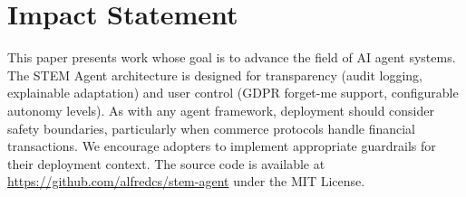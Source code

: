 \documentclass{article}
\begin{document}
\section*{Impact Statement}

This paper presents work whose goal is to advance the field of AI agent systems. The STEM Agent architecture is designed for transparency (audit logging, explainable adaptation) and user control (GDPR forget-me support, configurable autonomy levels). As with any agent framework, deployment should consider safety boundaries, particularly when commerce protocols handle financial transactions. We encourage adopters to implement appropriate guardrails for their deployment context. The source code is available at \url{https://github.com/alfredcs/stem-agent} under the MIT License.



\end{document}
